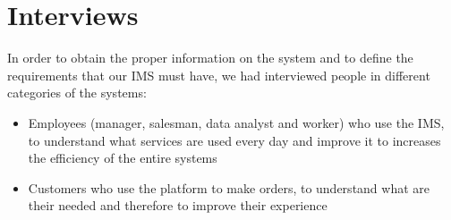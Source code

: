 \section{Interviews}

In order to obtain the proper information on the system and to define the requirements that our IMS must have, we had interviewed people in different categories of the systems:

\begin{itemize}
    \item Employees (manager, salesman, data analyst and worker) who use the IMS, to understand what services are used every day and improve it to increases the efficiency of the entire systems
    \item Customers who use the platform to make orders, to understand what are their needed and therefore to improve their experience
\end{itemize}